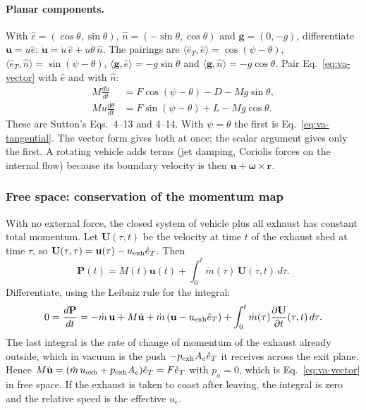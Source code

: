 \paragraph{Planar components.} With $\hat e=(\cos\theta,\sin\theta)$,
$\hat n=(-\sin\theta,\cos\theta)$ and $\mathbf g=(0,-g)$, differentiate
$\mathbf u=u\hat e$:
$\dot{\mathbf u}=\dot u\,\hat e+u\dot\theta\,\hat n$. The pairings are
$\langle\hat e_T,\hat e\rangle=\cos(\psi-\theta)$,
$\langle\hat e_T,\hat n\rangle=\sin(\psi-\theta)$,
$\langle\mathbf g,\hat e\rangle=-g\sin\theta$ and
$\langle\mathbf g,\hat n\rangle=-g\cos\theta$. Pair
Eq.~\ref{eq:va-vector} with $\hat e$ and with $\hat n$:
\begin{equation}\label{eq:va-planar}
\begin{aligned}
 M\frac{du}{dt}&=F\cos(\psi-\theta)-D-Mg\sin\theta,\\
 Mu\frac{d\theta}{dt}&=F\sin(\psi-\theta)+L-Mg\cos\theta .
\end{aligned}
\end{equation}
These are Sutton's Eqs.~4--13 and 4--14. With $\psi=\theta$ the first is
Eq.~\ref{eq:va-tangential}. The vector form gives both at once; the scalar
argument gives only the first. A rotating vehicle adds terms (jet damping,
Coriolis forces on the internal flow) because its boundary velocity is then
$\mathbf u+\boldsymbol\omega\times\mathbf r$.

\subsubsection*{Free space: conservation of the momentum map}
With no external force, the closed system of vehicle plus all exhaust has
constant total momentum. Let $\mathbf U(\tau,t)$ be the velocity at time $t$
of the exhaust shed at time $\tau$, so $\mathbf U(\tau,\tau)=\mathbf u(\tau)
-u_{\rm exh}\hat e_T$. Then
\[
 \mathbf P(t)=M(t)\mathbf u(t)+\int_0^t\dot m(\tau)\,\mathbf U(\tau,t)\,d\tau .
\]
Differentiate, using the Leibniz rule for the integral:
\[
 0=\frac{d\mathbf P}{dt}
 =-\dot m\,\mathbf u+M\dot{\mathbf u}
  +\dot m\,(\mathbf u-u_{\rm exh}\hat e_T)
  +\int_0^t\dot m(\tau)\frac{\partial\mathbf U}{\partial t}(\tau,t)\,d\tau .
\]
The last integral is the rate of change of momentum of the exhaust already
outside, which in vacuum is the push $-p_{\rm exh}A_e\hat e_T$ it receives
across the exit plane. Hence $M\dot{\mathbf u}=(\dot m\,u_{\rm exh}
+p_{\rm exh}A_e)\hat e_T=F\hat e_T$ with $p_a=0$, which is
Eq.~\ref{eq:va-vector} in free space. If the exhaust is taken to coast after
leaving, the integral is zero and the relative speed is the effective $u_e$.

